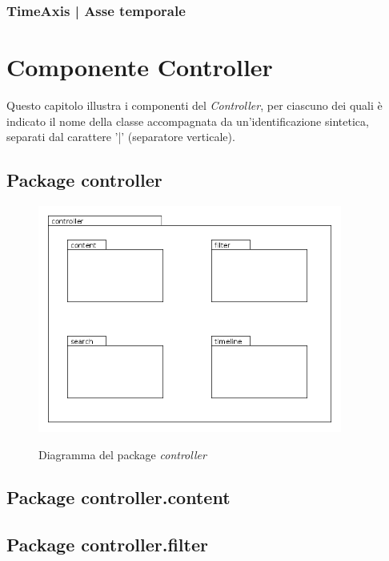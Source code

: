 \documentclass[10pt,a4paper,headinclude,footinclude,hidelinks]{scrreprt} %
\begin{document}
	\subsection[TimeAxis]{TimeAxis | Asse temporale}
	\label{sec:stage:design:sistema:view.timeline:time-axis}

	\chapter{Componente Controller}
	\label{ch:stage:design:controller}
	Questo capitolo illustra i componenti del \textit{Controller}, per ciascuno dei quali è indicato il nome della classe accompagnata da un'identificazione sintetica, separati dal carattere '|' (separatore verticale).

	\section{Package controller}
	\label{ch:stage:design:sistema:controller}

	\begin{figure}[ht]
		\begin{center}
	    	\includegraphics[width=10cm]{package/controller.png}
			\label{gfx:package:controller}
			\caption{Diagramma del package \textit{controller}}
		\end{center}
	\end{figure}

	\section{Package controller.content}
	\label{ch:stage:design:sistema:controller.content}

	\section{Package controller.filter}
	\label{ch:stage:design:sistema:controller.filter}
\end{document}
